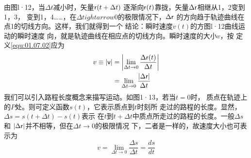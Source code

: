 由图l·12，当$\Delta t$减小时，矢量${\sf r}(t+\Delta t)$
逐渐向${\sf r}(t)$靠拢，矢量$\Delta {\sf r}$相继从1，2变到1，3，
变到1，4……，在$\Delta t ightarrow 0$的极限情况下，$\Delta {\sf r}$
的方向趋于轨迹曲线在点1的切线方向。这样，我们就得到一个
结论：瞬时速度$v(t)$的方图l·12曲线运动的瞬时速度
向，就是轨迹曲线在相应点的切线方向。瞬时速度的大小$v$，按
定义\eqref{equ:01.07.02}应为
\begin{equation*}
    \begin{aligned}
        v\equiv |{\sf v}| & =\left|\lim _{\Delta t \rightarrow 0} \frac{\Delta {\sf r}(t)}{\Delta t}\right| \\
                         & =\lim _{\Delta t \rightarrow 0} \frac{|\Delta {\sf r}|}{\Delta t}
    \end{aligned}
\end{equation*}
我们可以引入路程长度概念来描写运动。如图1·13，若当$t=0$时，
质点在轨迹上的$P$处。则可定义函数$s(t)$，它表示质点到$t$时刻所
走过的路程的长度。显然，$\Delta s=s(t+\Delta t)-s(t)$表示
在$t$到$t+\Delta t$中质点所走过的路程的长度。一般$\Delta s$和
$|\Delta {\sf r}|$并不相等，但在$\Delta t \rightarrow 0$的极限情况
下，二者是一样的，故速度大小也可表示为
\begin{equation}\label{equ:01.07.05}
    v=\lim_{\Delta t \rightarrow 0}\frac{\Delta s}{\Delta t}=\frac{ds}{dt}
\end{equation}

